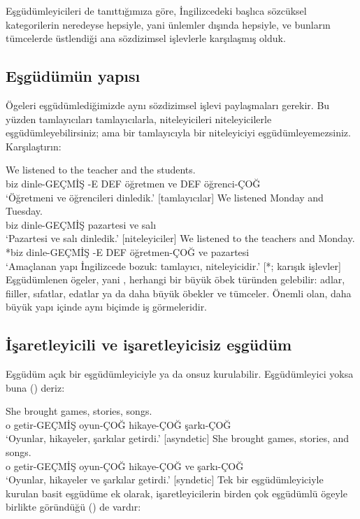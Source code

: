 Eşgüdümleyicileri de tanıttığımıza göre, İngilizcedeki başlıca sözcüksel kategorilerin neredeyse hepsiyle, yani ünlemler dışında hepsiyle, ve bunların tümcelerde üstlendiği ana sözdizimsel işlevlerle karşılaşmış olduk.

\subsection{Eşgüdümün yapısı}

Ögeleri eşgüdümlediğimizde aynı sözdizimsel işlevi paylaşmaları gerekir. Bu yüzden tamlayıcıları tamlayıcılarla, niteleyicileri niteleyicilerle eşgüdümleyebilirsiniz; ama bir tamlayıcıyla bir niteleyiciyi eşgüdümleyemezsiniz. Karşılaştırın:

\ea \label{ex:coord-function-tr}
    \ea \gll We listened {\ob}to the teacher{\cb} {\ob}and the students{\cb}.\\
        biz dinle-GEÇMİŞ -E DEF öğretmen ve DEF öğrenci-ÇOĞ\\
    \glt `Öğretmeni ve öğrencileri dinledik.' [tamlayıcılar]
    \ex \gll We listened {\ob}Monday{\cb} and {\ob}Tuesday{\cb}.\\
        biz dinle-GEÇMİŞ pazartesi ve salı\\
    \glt `Pazartesi ve salı dinledik.' [niteleyiciler]
    \ex \gll *We listened {\ob}to the teachers{\cb} and {\ob}Monday{\cb}.\\
        *biz dinle-GEÇMİŞ -E DEF öğretmen-ÇOĞ ve pazartesi\\
    \glt `Amaçlanan yapı İngilizcede bozuk:  tamlayıcı,  niteleyicidir.' [*; karışık işlevler]
    \z
\z
Eşgüdümlenen ögeler, yani , herhangi bir büyük öbek türünden gelebilir: adlar, fiiller, sıfatlar, edatlar ya da daha büyük öbekler ve tümceler. Önemli olan, daha büyük yapı içinde aynı biçimde iş görmeleridir.

\subsection{İşaretleyicili ve işaretleyicisiz eşgüdüm}

Eşgüdüm açık bir eşgüdümleyiciyle ya da onsuz kurulabilir. Eşgüdümleyici yoksa buna  () deriz:

\ea \label{ex:coord-marking-tr}
    \ea \gll She brought {\ob}games{\cb}, {\ob}stories{\cb}, {\ob}songs{\cb}.\\
        o getir-GEÇMİŞ oyun-ÇOĞ hikaye-ÇOĞ şarkı-ÇOĞ\\
    \glt `Oyunlar, hikayeler, şarkılar getirdi.' [asyndetic]
    \ex \gll She brought {\ob}games{\cb}, {\ob}stories{\cb}, and {\ob}songs{\cb}.\\
        o getir-GEÇMİŞ oyun-ÇOĞ hikaye-ÇOĞ ve şarkı-ÇOĞ\\
    \glt `Oyunlar, hikayeler ve şarkılar getirdi.' [syndetic]
    \z
\z
Tek bir eşgüdümleyiciyle kurulan basit eşgüdüme ek olarak, işaretleyicilerin birden çok eşgüdümlü ögeyle birlikte göründüğü  () de vardır:

